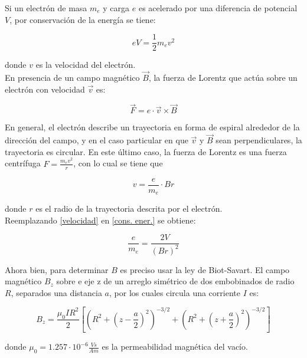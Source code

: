 \documentclass[prb,aps,twocolumn,preprintnumbers,amsmath,amssymb]{revtex4}
\begin{document}
Si un electrón de masa $m_{e}$ y carga $e$ es acelerado por una diferencia de potencial $V$, por conservación de la energía se tiene:

\begin{equation}
\label{cons. ener.}
eV = \frac{1}{2} m_{e} v^2
\end{equation}

\noindent
donde $v$ es la velocidad del electrón.\\

En presencia de un campo magnético $\vec{B}$, la fuerza de Lorentz que actúa sobre un electrón con velocidad $\vec{v}$ es: 

\begin{equation}
\vec{F} = e\cdot\vec{v}\times\vec{B}
\end{equation}

En general, el electrón describe un trayectoria en forma de espiral alrededor de la dirección del campo, y en el caso particular en que $\vec{v}$ y $\vec{B}$ sean perpendiculares, la trayectoria es circular. En este último caso, la fuerza de Lorentz es una fuerza centrífuga $F = \frac{m_{e}v^2}{r}$, con lo cual se tiene que 

\begin{equation}
\label{velocidad}
v = \frac{e}{m_{e}} \cdot Br
\end{equation}

\noindent
donde $r$ es el radio de la trayectoria descrita por el electrón.\\
\indent
Reemplazando \eqref{velocidad} en \eqref{cons. ener.} se obtiene:

\begin{equation}
\label{carga-masa}
\frac{e}{m_{e}} = \frac{2V}{(Br)^2}
\end{equation}

Ahora bien, para determinar $B$ es preciso usar la ley de Biot-Savart. El campo magnético $B_{z}$ sobre e eje z de un arreglo simétrico de dos embobinados de radio $R$, separados una distancia $a$, por los cuales circula una corriente $I$ es:

\begin{equation*}
B_{z} = \frac{\mu_{0}IR^2}{2}\left[ \left( R^2 + \left(z - \frac{a}{2}\right)^2 \right)^{-3/2} + \left( R^2 + \left(z + \frac{a}{2}\right)^2 \right)^{-3/2} \right]
\end{equation*}

\noindent
donde $\mu_{0} = 1.257\cdot10^{-6} \frac{Vs}{Am}$ es la permeabilidad magnética del vacío.\\
\end{document}
